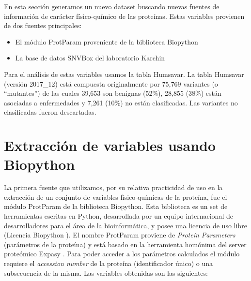 
En esta sección generamos un nuevo dataset buscando nuevas fuentes de información de carácter físico-químico de las proteínas. Estas variables provienen de dos fuentes principales:

\begin{itemize}
    \item El módulo ProtParam proveniente de la biblioteca Biopython \cite{Chapman:2000:BPT:360262.360268}
    \item La base de datos SNVBox del laboratorio Karchin \cite{Wong2011}
\end{itemize}

Para el análisis de estas variables usamos la tabla Humsavar. La tabla Humsavar (versión 2017\_12) \cite{humsavar} está compuesta originalmente por 75,769 variantes (o ``mutantes'') de las cuales 39,653 son benignas (52\%), 28,855 (38\%) están asociadas a enfermedades y 7,261 (10\%) no están clasificadas. Las variantes no clasificadas fueron descartadas. 

\section{Extracción de variables usando Biopython}

La primera fuente que utilizamos, por su relativa practicidad de uso en la extracción de un conjunto de variables físico-químicas de la proteína, fue el módulo ProtParam de la biblioteca Biopython. Esta biblioteca es un set de herramientas escritas en Python, desarrollada por un equipo internacional de desarrolladores para el área de la bioinformática, y posee una licencia de uso libre (Licencia Biopython \cite{biopython-license}).
El nombre ProtParam proviene de \textit{Protein Parameters} (parámetros de la proteína) y está basado en la herramienta homónima del server proteómico Expasy \cite{expasy}. Para poder acceder a los parámetros calculados el módulo requiere el \textit{accession number} de la proteína (identificador único) o una subsecuencia de la misma. Las variables obtenidas son las siguientes:

